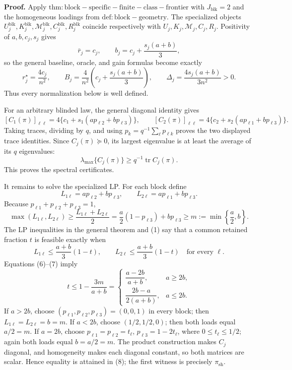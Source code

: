 \textbf{Proof.}
Apply \(\mathrm{thm:block-specific-finite-class-frontier}\) with \(J_{\mathrm{blk}}=2\) and the homogeneous loadings from \(\mathrm{def:block-geometry}\). The specialized objects \(U_j^{\mathrm{blk}},K_j^{\mathrm{blk}},\mathcal M_j^{\mathrm{blk}},C_j^{\mathrm{blk}},R_j^{\mathrm{blk}}\) coincide respectively with \(U_j,K_j,\mathcal M_j,C_j,R_j\). Positivity of \(a,b,c_j,s_j\) gives
\[
\bar r_j=c_j,
\qquad
b_j=c_j+\frac{s_j(a+b)}3,
\tag{1}
\]
so the general baseline, oracle, and gain formulas become exactly
\[
r_j^\star=\frac{4c_j}{n^2},
\qquad
B_j=\frac4{n^2}\left(c_j+\frac{s_j(a+b)}3\right),
\qquad
\Delta_j=\frac{4s_j(a+b)}{3n^2}>0.
\tag{2}
\]
Thus every normalization below is well defined.

For an arbitrary blinded law, the general diagonal identity gives
\[
[C_1(\pi)]_{\ell\ell}
=4\{c_1+s_1(ap_{\ell2}+bp_{\ell3})\},
\qquad
[C_2(\pi)]_{\ell\ell}
=4\{c_2+s_2(ap_{\ell1}+bp_{\ell3})\}.
\tag{3}
\]
Taking traces, dividing by \(q\), and using \(p_k=q^{-1}\sum_\ell p_{\ell k}\) proves the two displayed trace identities. Since \(C_j(\pi)\succeq0\), its largest eigenvalue is at least the average of its \(q\) eigenvalues:
\[
\lambda_{\max}\{C_j(\pi)\}\ge q^{-1}\operatorname{tr}C_j(\pi).
\tag{4}
\]
This proves the spectral certificates.

It remains to solve the specialized LP. For each block define
\[
L_{1\ell}=ap_{\ell2}+bp_{\ell3},
\qquad
L_{2\ell}=ap_{\ell1}+bp_{\ell3}.
\tag{5}
\]
Because \(p_{\ell1}+p_{\ell2}+p_{\ell3}=1\),
\[
\max(L_{1\ell},L_{2\ell})
\ge\frac{L_{1\ell}+L_{2\ell}}2
=\frac a2(1-p_{\ell3})+bp_{\ell3}
\ge m:=\min\left\{\frac a2,b\right\}.
\tag{6}
\]
The LP inequalities in the general theorem and (1) say that a common retained fraction \(t\) is feasible exactly when
\[
L_{1\ell}\le\frac{a+b}{3}(1-t),
\qquad
L_{2\ell}\le\frac{a+b}{3}(1-t)
\quad\text{for every }\ell.
\tag{7}
\]
Equations (6)--(7) imply
\[
t\le1-\frac{3m}{a+b}
=
\begin{cases}
\dfrac{a-2b}{a+b},&a\ge2b,\\[6pt]
\dfrac{2b-a}{2(a+b)},&a\le2b.
\end{cases}
\tag{8}
\]
If \(a>2b\), choose \((p_{\ell1},p_{\ell2},p_{\ell3})=(0,0,1)\) in every block; then \(L_{1\ell}=L_{2\ell}=b=m\). If \(a<2b\), choose \((1/2,1/2,0)\); then both loads equal \(a/2=m\). If \(a=2b\), choose \(p_{\ell1}=p_{\ell2}=t_\ell\), \(p_{\ell3}=1-2t_\ell\), where \(0\le t_\ell\le1/2\); again both loads equal \(b=a/2=m\). The product construction makes \(C_j\) diagonal, and homogeneity makes each diagonal constant, so both matrices are scalar. Hence equality is attained in (8); the first witness is precisely \(\pi_{\mathrm{sh}}\).

